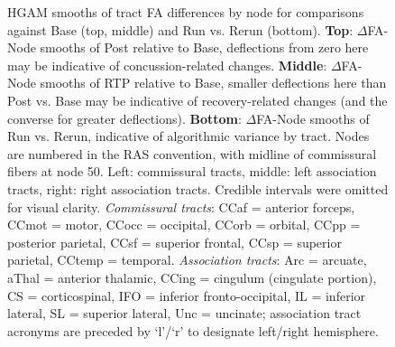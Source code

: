 \documentclass[12pt]{article}
\begin{document}
\begin{figure}[H]
	\centering
	\caption{HGAM smooths of tract FA differences by node for comparisons against Base (top, middle) and Run vs. Rerun (bottom). \textbf{Top}: $\Delta$FA-Node smooths of Post relative to Base, deflections from zero here may be indicative of concussion-related changes. \textbf{Middle}: $\Delta$FA-Node smooths of RTP relative to Base, smaller deflections here than Post vs. Base may be indicative of recovery-related changes (and the converse for greater deflections). \textbf{Bottom}: $\Delta$FA-Node smooths of Run vs. Rerun, indicative of algorithmic variance by tract. Nodes are numbered in the RAS convention, with midline of commissural fibers at node 50. Left: commissural tracts, middle: left association tracts, right: right association tracts. Credible intervals were omitted for visual clarity. \textit{Commissural tracts}: CCaf = anterior forceps, CCmot = motor, CCocc = occipital, CCorb = orbital, CCpp = posterior parietal, CCsf = superior frontal, CCsp = superior parietal, CCtemp = temporal. \textit{Association tracts}: Arc = arcuate, aThal = anterior thalamic, CCing = cingulum (cingulate portion), CS = corticospinal, IFO = inferior fronto-occipital, IL = inferior lateral, SL = superior lateral, Unc = uncinate; association tract acronyms are preceded by `l'/`r' to designate left/right hemisphere.}
	\label{fig:ldi-gam}
\end{figure}
\end{document}
